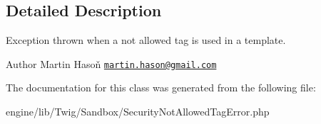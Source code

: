 \subsection{Detailed Description}
Exception thrown when a not allowed tag is used in a template.

\begin{DoxyAuthor}{Author}
Martin Hasoň \href{mailto:martin.hason@gmail.com}{\tt martin.\+hason@gmail.\+com} 
\end{DoxyAuthor}


The documentation for this class was generated from the following file\+:\begin{DoxyCompactItemize}
\item 
engine/lib/\+Twig/\+Sandbox/Security\+Not\+Allowed\+Tag\+Error.\+php\end{DoxyCompactItemize}
